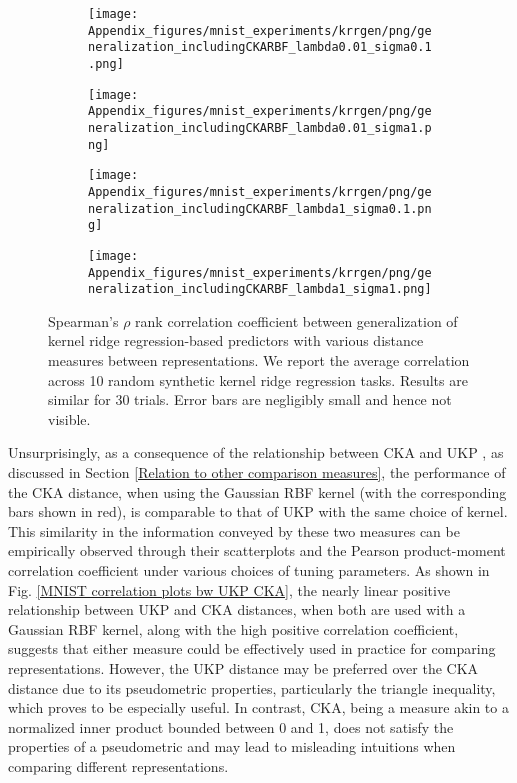 \documentclass{article} %
\newcommand{\metricstname}{UKP }
\theoremstyle{plain}
\begin{document}
\begin{figure}[!h]
    \centering
    \begin{subfigure}[b]{0.45\textwidth}
        \texttt{[image: Appendix\_figures/mnist\_experiments/krrgen/png/generalization\_includingCKARBF\_lambda0.01\_sigma0.1.png]}
    \end{subfigure}
    \hfill
    \begin{subfigure}[b]{0.45\textwidth}
        \texttt{[image: Appendix\_figures/mnist\_experiments/krrgen/png/generalization\_includingCKARBF\_lambda0.01\_sigma1.png]}
    \end{subfigure}
    
    \vspace{0.5cm}  %
    
    \begin{subfigure}[b]{0.45\textwidth}
        \texttt{[image: Appendix\_figures/mnist\_experiments/krrgen/png/generalization\_includingCKARBF\_lambda1\_sigma0.1.png]}
    \end{subfigure}
    \hfill
    \begin{subfigure}[b]{0.45\textwidth}
        \texttt{[image: Appendix\_figures/mnist\_experiments/krrgen/png/generalization\_includingCKARBF\_lambda1\_sigma1.png]}
    \end{subfigure}
    
    \caption{Spearman's $\rho$ rank correlation coefficient between generalization of kernel ridge regression-based predictors with various distance measures between representations. We report the average correlation across 10 random synthetic kernel ridge regression tasks. Results are similar for 30 trials. Error bars are negligibly small and hence not visible.}
    \label{MNIST generalization plots}
\end{figure}

Unsurprisingly, as a consequence of the relationship between CKA and \metricstname, as discussed in Section \ref{Relation to other comparison measures}, the performance of the CKA distance, when using the Gaussian RBF kernel (with the corresponding bars shown in red), is comparable to that of \metricstname with the same choice of kernel. This similarity in the information conveyed by these two measures can be empirically observed through their scatterplots and the Pearson product-moment correlation coefficient under various choices of tuning parameters. As shown in Fig. \ref{MNIST correlation plots bw UKP CKA}, the nearly linear positive relationship between \metricstname and CKA distances, when both are used with a Gaussian RBF kernel, along with the high positive correlation coefficient, suggests that either measure could be effectively used in practice for comparing representations. However, the \metricstname distance may be preferred over the CKA distance due to its pseudometric properties, particularly the triangle inequality, which proves to be especially useful. In contrast, CKA, being a measure akin to a normalized inner product bounded between 0 and 1, does not satisfy the properties of a pseudometric and may lead to misleading intuitions when comparing different representations.
\end{document}
